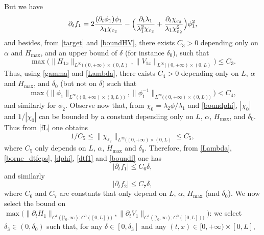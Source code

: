 But we have
\begin{equation}
\label{dtf1}
\partial_{t}f_{1}=2\frac{(\partial_{t}\phi_{1})\phi_{1}}{\lambda_{1}\chi_{\varepsilon_{2}}}-\Bigl(\frac{\partial_{t}\lambda_{1}}{\lambda_{1}^{2}\chi_{\varepsilon_{2}}}+\frac{\partial_{t}\chi_{\varepsilon_{2}}}{\lambda_{1}\chi^{2}_{\varepsilon_{2}}} \Bigr)\phi_{1}^2,
\end{equation}
and besides, from \eqref{target} and \eqref{boundHV}, there exists $C_{3}>0$ depending only on $\alpha$ and $H_{\max}$, and an upper bound of $\delta$ (for instance ${\delta_{0}}$), such that
\begin{equation*}
\max\bigl(\lVert H_{1x}\rVert_{L^{\infty}((0,+\infty)\times(0,L)},\lVert V_{1x}\rVert_{L^{\infty}((0,+\infty)\times(0,L)}\bigr)\leq C_{3}.
\end{equation*}
Thus, using \eqref{gamma} and \eqref{Lambda}, there exists $C_{4}>0$ depending only on {$L$,} $\alpha$ and $H_{\max}$, and $\delta_{0}$ (but not on $\delta$) such that
\begin{equation}
\max \bigl(\lVert\phi_{1}\rVert_{L^{\infty}((0,+\infty)\times(0,L){)}},\lVert\phi^{-1}_{{1}}\rVert_{L^{\infty}((0,+\infty)\times(0,L){)}} \bigr)<C_{4},
\label{boundphi}
\end{equation}
and similarly for $\phi_{2}$.
Observe now that, from $\chi_{0}=\lambda_{2}\phi/\lambda_{1}$ and \eqref{boundphi}, $|\chi_{0}|$ and $1/|\chi_{0}|$ can be bounded by a constant depending only on {$L$,} $\alpha$, $H_{\max}$, and
$\delta_{0}$. Thus from
\eqref{fL} one obtains
\begin{equation}
1/C_{5}\leq \lVert \chi_{\varepsilon_{2}}\rVert_{L^{\infty}((0,+\infty)\times(0,L)}\leq C_{5},
\label{boundf}
\end{equation}
where $C_{5}$ only depends on {$L$,} $\alpha$, $H_{\max}$ and $\delta_{0}$.
{Therefore}, from
\eqref{Lambda}, \eqref{borne_dtfeps}, \eqref{dphi}, {\eqref{dtf1}} and \eqref{boundf} one has
\begin{equation*}
|\partial_{t}f_{1}|\leq C_{6}\delta,
\end{equation*}
and similarly
\begin{equation*}
|\partial_{t}f_{2}|\leq C_{7}\delta,
\end{equation*}
where $C_{6}$ and $C_{7}$ are constants that only depend on {$L$,} $\alpha$, $H_{\max}$ (and $\delta_{0}$).
We now select the bound on
$\max \bigl({\lVert\partial_{t}H_{1}\rVert_{C^{1}([t_{0},\infty);{C^{0}([0,L])})},\lVert\partial_{t}V_{1}\rVert_{C^{1}([t_{0},\infty);{C^{0}([0,L])})}} \bigr)$:
we select $\delta_{3}\in(0,\delta_{0})$ such that, for any $\delta\in[0,\delta_{3}]$ and any $(t,x)\in[0,{+}\infty)\times[0,L]$,
